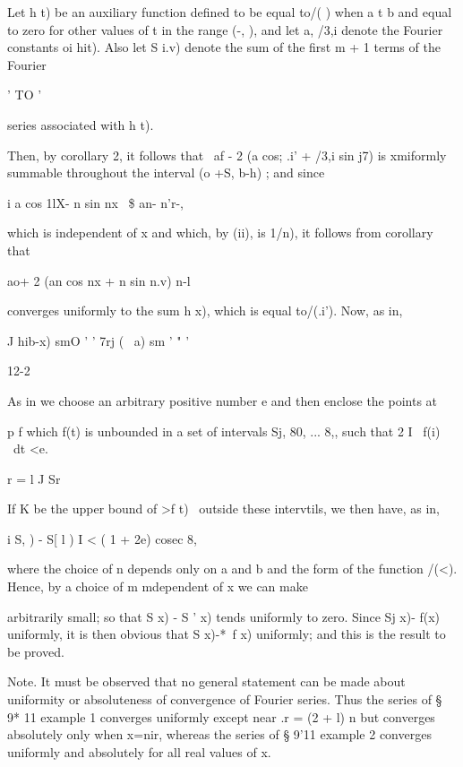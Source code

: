 Let h t) be an auxiliary function defined to be equal to/( ) when a t
b and equal to zero for other values of t in the range (-\pi, \pi), and
let a, /3,i denote the Fourier constants oi hit). Also let S i.v)
denote the sum of the first m + 1 terms of the Fourier

  ' TO '

series associated with h t).

Then, by corollary 2, it follows that \ af - 2 (a cos; .i' +
/3,i sin j7) is xmiformly summable throughout the interval (o +S, b-h)
; and since

i a cos 1lX- n sin nx \ \$ an- n'r-,

which is independent of x and which, by (ii), is 1/n), it
follows from corollary that

 ao+ 2 (an cos nx + n sin n.v) n-l

converges uniformly to the sum h x), which is equal to/(.i'). Now, as
in,

   J hib-x) smO ' ' 7rj ( \ a) sm ' " '

12-2

%
%

As in we choose an arbitrary positive number e and then enclose
the points at

p f which f(t) is unbounded in a set of intervals Sj, 80, ... 8,, such
that 2 I \ f(i) \ dt <e.

r = l J Sr

If K be the upper bound of >f t) \ outside these intervtils, we then
have, as in,

i S, ) - S[ l ) I < ( 1 + 2e) cosec 8,

where the choice of n depends only on a and b and the form of the
function /(<). Hence, by a choice of m mdependent of x we can make

arbitrarily small; so that S x) - S ' x) tends uniformly to zero.
Since Sj x)- f(x) uniformly, it is then obvious that S x)-*~f x)
uniformly; and this is the result to be proved.

Note. It must be observed that no general statement can be made about
uniformity or absoluteness of convergence of Fourier series. Thus the
series of § 9* 11 example 1 converges uniformly except near .r = (2 +
l) n but converges absolutely only when x=nir, whereas the series of §
9'11 example 2 converges uniformly and absolutely for all real values
of x.

